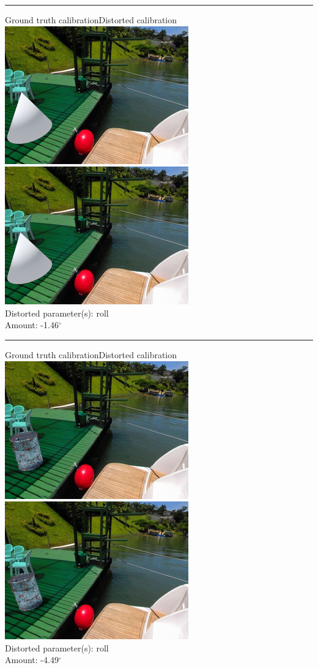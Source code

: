 \begin{minipage}{\linewidth}
\centering
\hrule\vspace{1em}
Ground truth calibration\hspace{0.2\linewidth}Distorted calibration\
\includegraphics[width=0.45\linewidth]{study/thumb/pano_ahxngxlbcrplaw-6_3_gt.jpg}
\includegraphics[width=0.45\linewidth]{study/thumb/pano_ahxngxlbcrplaw-6_3_dc.jpg}\\
Distorted parameter(s): roll\\
Amount: -1.46$^\circ$
\end{minipage}

\begin{minipage}{\linewidth}
\centering
\hrule\vspace{1em}
Ground truth calibration\hspace{0.2\linewidth}Distorted calibration\
\includegraphics[width=0.45\linewidth]{study/thumb/pano_ahxngxlbcrplaw-6_4_gt.jpg}
\includegraphics[width=0.45\linewidth]{study/thumb/pano_ahxngxlbcrplaw-6_4_dc.jpg}\\
Distorted parameter(s): roll\\
Amount: -4.49$^\circ$
\end{minipage}

